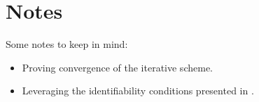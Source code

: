 \documentclass[a4paper, 11pt]{article}
\begin{document}
\begin{sloppypar}
\section{Notes}\label{s:3}
Some notes to keep in mind:
\begin{itemize}
  \item Proving convergence of the iterative scheme.
  \item Leveraging the identifiability conditions presented in \cite{guan2024identifyingdriftdiffusioncausal}.
\end{itemize}





\end{sloppypar}
\end{document}
